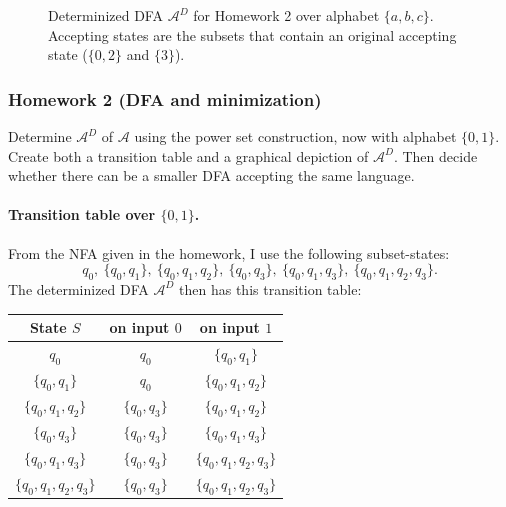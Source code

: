 \documentclass{article}
\theoremstyle{theorem}
\theoremstyle{definition}
\theoremstyle{remark}
\begin{document}
\begin{figure}[H]
  \centering
  \caption{Determinized DFA $\mathcal{A}^D$ for Homework 2 over alphabet $\{a,b,c\}$. Accepting states are the subsets that contain an original accepting state ($\{0,2\}$ and $\{3\}$).}
  \label{fig:week3hw2}
\end{figure}

\subsubsection*{Homework 2 (DFA and minimization)}
Determine $\mathcal{A}^D$ of $\mathcal{A}$ using the power set construction, now with alphabet $\{0,1\}$. Create both a transition table and a graphical depiction of $\mathcal{A}^D$. Then decide whether there can be a smaller DFA accepting the same language.

\paragraph{Transition table over $\{0,1\}$.}
From the NFA given in the homework, I use the following subset-states:
\[
q_0,\ \{q_0,q_1\},\ \{q_0,q_1,q_2\},\ \{q_0,q_3\},\ \{q_0,q_1,q_3\},\ \{q_0,q_1,q_2,q_3\}.
\]
The determinized DFA $\mathcal{A}^D$ then has this transition table:

\begin{center}
\begin{tabular}{|c|c|c|}
  \hline
  State $S$ & on input $0$ & on input $1$ \\
  \hline
  $q_0$                     & $q_0$                   & $\{q_0,q_1\}$ \\
  $\{q_0,q_1\}$             & $q_0$                   & $\{q_0,q_1,q_2\}$ \\
  $\{q_0,q_1,q_2\}$         & $\{q_0,q_3\}$           & $\{q_0,q_1,q_2\}$ \\
  $\{q_0,q_3\}$             & $\{q_0,q_3\}$           & $\{q_0,q_1,q_3\}$ \\
  $\{q_0,q_1,q_3\}$         & $\{q_0,q_3\}$           & $\{q_0,q_1,q_2,q_3\}$ \\
  $\{q_0,q_1,q_2,q_3\}$     & $\{q_0,q_3\}$           & $\{q_0,q_1,q_2,q_3\}$ \\
  \hline
\end{tabular}
\end{center}
\end{document}
